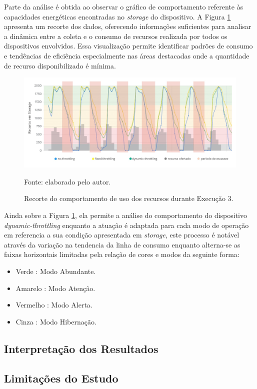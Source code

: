 Parte da análise é obtida ao observar o gráfico de comportamento referente às capacidades energéticas encontradas no \textit{storage} do dispositivo. A Figura \ref{fig:cap6recortecomportamentostorage} apresenta um recorte dos dados, oferecendo informações suficientes para analisar a dinâmica entre a coleta e o consumo de recursos realizada por todos os dispositivos envolvidos. Essa visualização permite identificar padrões de consumo e tendências de eficiência especialmente nas áreas destacadas onde a quantidade de recurso disponibilizado é mínima.

\begin{figure}[H]
	\centering	
	\caption{Recorte do comportamento de uso dos recursos durante Execução 3.} 
	\label{fig:cap6recortecomportamentostorage}
	\noindent\includegraphics[width=1\linewidth]{Imagens/cap6/cap6recortecomportamentostorage.jpg} 
	
	Fonte: elaborado pelo autor.
\end{figure}

Ainda sobre a Figura \ref{fig:cap6recortecomportamentostorage}, ela permite a análise do comportamento do dispositivo \textit{dynamic-throttling} enquanto a atuação é adaptada para cada modo de operação em referencia a sua condição apresentada em \textit{storage}, este processo é notável através da variação na tendencia da linha de consumo enquanto alterna-se as faixas horizontais limitadas pela relação de cores e modos da seguinte forma:

\begin{itemize}
	\item Verde : Modo Abundante.
	\item Amarelo : Modo Atenção.
	\item Vermelho : Modo Alerta.
	\item Cinza : Modo Hibernação.
\end{itemize} 

\subsection{Interpretação dos Resultados}

\subsection{Limitações do Estudo}

 
